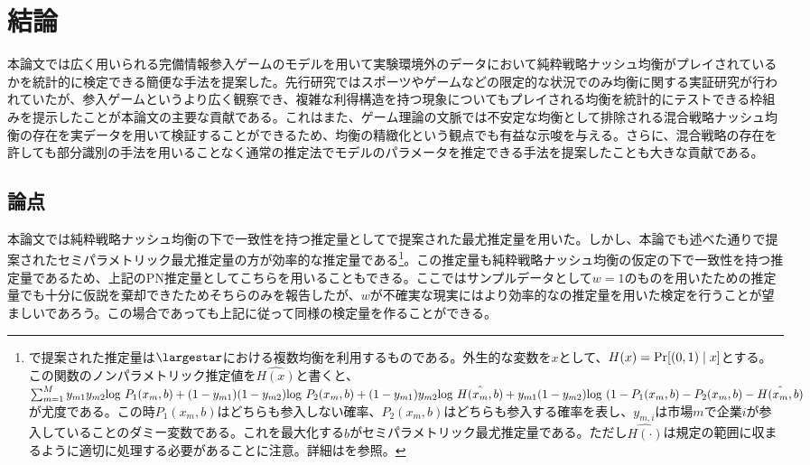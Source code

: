 
\chapter{結論}
本論文では広く用いられる完備情報参入ゲームのモデルを用いて実験環境外のデータにおいて純粋戦略ナッシュ均衡がプレイされているかを統計的に検定できる簡便な手法を提案した。先行研究ではスポーツやゲームなどの限定的な状況でのみ均衡に関する実証研究が行われていたが、参入ゲームというより広く観察でき、複雑な利得構造を持つ現象についてもプレイされる均衡を統計的にテストできる枠組みを提示したことが本論文の主要な貢献である。これはまた、ゲーム理論の文脈では不安定な均衡として排除される混合戦略ナッシュ均衡の存在を実データを用いて検証することができるため、均衡の精緻化という観点でも有益な示唆を与える。さらに、混合戦略の存在を許しても部分識別の手法を用いることなく通常の推定法でモデルのパラメータを推定できる手法を提案したことも大きな貢献である。

\section{論点}
本論文では純粋戦略ナッシュ均衡の下で一致性を持つ推定量として\cite{Bresnahan1991}で提案された最尤推定量を用いた。しかし、本論でも述べた通り\cite{Tamer2003a}で提案されたセミパラメトリック最尤推定量の方が効率的な推定量である\footnote{\cite{Tamer2003a}で提案された推定量は$\largestar$における複数均衡を利用するものである。外生的な変数を$x$として、$H(x) = {\rm Pr}[(0,1)\mid x]$とする。この関数のノンパラメトリック推定値を$\hat{H(x)}$と書くと、$\sum_{m = 1}^{M} y_{m1}y_{m2} {\rm log}\ P_1(x_m, b) + (1-y_{m1})(1-y_{m2}) {\rm log}\ P_2(x_m, b) + (1-y_{m1})y_{m2} {\rm log}\ \hat{H(x_m, b)} + y_{m1}(1-y_{m2}) {\rm log}\ (1-P_1(x_m, b)-P_2(x_m, b) - \hat{H(x_m, b)}$が尤度である。この時$P_1(x_m, b)$はどちらも参入しない確率、$P_2(x_m, b)$はどちらも参入する確率を表し、$y_{m, i}$は市場$m$で企業$i$が参入していることのダミー変数である。これを最大化する$b$がセミパラメトリック最尤推定量である。ただし$\hat{H(\cdot)}$は規定の範囲に収まるように適切に処理する必要があることに注意。詳細は\cite{Tamer2003a}を参照。}。この推定量も純粋戦略ナッシュ均衡の仮定の下で一致性を持つ推定量であるため、上記のPN推定量としてこちらを用いることもできる。ここではサンプルデータとして$w = 1$のものを用いたため\cite{Bresnahan1991}の推定量でも十分に仮説を棄却できたためそちらのみを報告したが、$w$が不確実な現実にはより効率的な\cite{Tamer2003a}の推定量を用いた検定を行うことが望ましいであろう。この場合であっても上記に従って同様の検定量を作ることができる。


